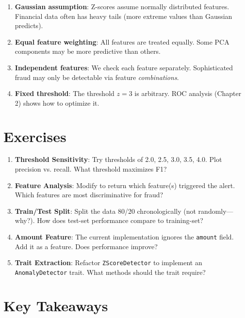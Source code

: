 \begin{enumerate}
    \item \textbf{Gaussian assumption}: Z-scores assume normally distributed features. Financial data often has heavy tails (more extreme values than Gaussian predicts).

    \item \textbf{Equal feature weighting}: All features are treated equally. Some PCA components may be more predictive than others.

    \item \textbf{Independent features}: We check each feature separately. Sophisticated fraud may only be detectable via feature \emph{combinations}.

    \item \textbf{Fixed threshold}: The threshold $z = 3$ is arbitrary. ROC analysis (Chapter 2) shows how to optimize it.
\end{enumerate}

\section{Exercises}

\begin{enumerate}
    \item \textbf{Threshold Sensitivity}: Try thresholds of 2.0, 2.5, 3.0, 3.5, 4.0. Plot precision vs. recall. What threshold maximizes F1?

    \item \textbf{Feature Analysis}: Modify  to return which feature(s) triggered the alert. Which features are most discriminative for fraud?

    \item \textbf{Train/Test Split}: Split the data 80/20 chronologically (not randomly---why?). How does test-set performance compare to training-set?

    \item \textbf{Amount Feature}: The current implementation ignores the \texttt{amount} field. Add it as a feature. Does performance improve?

    \item \textbf{Trait Extraction}: Refactor \texttt{ZScoreDetector} to implement an \texttt{AnomalyDetector} trait. What methods should the trait require?
\end{enumerate}

\section{Key Takeaways}

